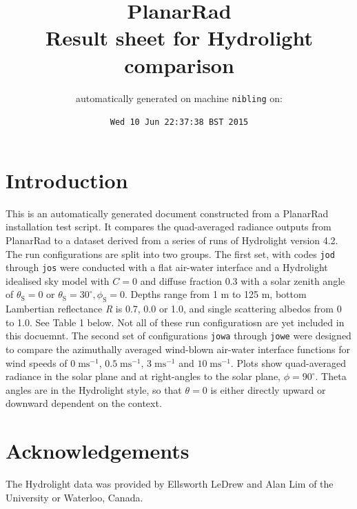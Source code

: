 \documentclass[10pt,a4paper]{article}
\begin{document}
\title{PlanarRad\\Result sheet for Hydrolight comparison}
\author{automatically generated on machine \texttt{nibling} on:}
\date{\texttt{Wed 10 Jun 22:37:38 BST 2015}}

\maketitle



\section*{Introduction}

This is an automatically generated document constructed from a PlanarRad installation test script. It compares the quad-averaged radiance outputs from PlanarRad to a dataset derived from a series of runs of Hydrolight version 4.2. The run configurations are split into two groups. The first set, with codes \texttt{jod} through \texttt{jos} were conducted with a flat air-water interface and a Hydrolight idealised sky model with $C=0$ and diffuse fraction 0.3 with a solar zenith angle of $\theta_\mathrm{S}=0$ or $\theta_\mathrm{S}=30^{\circ},\phi_\mathrm{S}=0$. Depths range from 1 m to 125 m, bottom Lambertian reflectance \textit{R} is 0.7, 0.0 or 1.0, and single scattering albedos from 0 to 1.0. See Table 1 below. Not all of these run configuratiosn are yet included in this docuemnt. The second set of configurations \texttt{jowa} through \texttt{jowe} were designed to compare the azimuthally averaged wind-blown air-water interface functions for wind speeds of $0\;\mathrm{ms}^{-1}$, $0.5\;\mathrm{ms}^{-1}$, $3\;\mathrm{ms}^{-1}$ and $10\;\mathrm{ms}^{-1}$. Plots show quad-averaged radiance in the solar plane and at right-angles to the solar plane, $\phi=90^{\circ}$. Theta angles are in the Hydrolight style, so that $\theta=0$ is either directly upward or downward dependent on the context.

\section*{Acknowledgements}

The Hydrolight data was provided by Ellsworth LeDrew and Alan Lim of the University or Waterloo, Canada.
\end{document}
